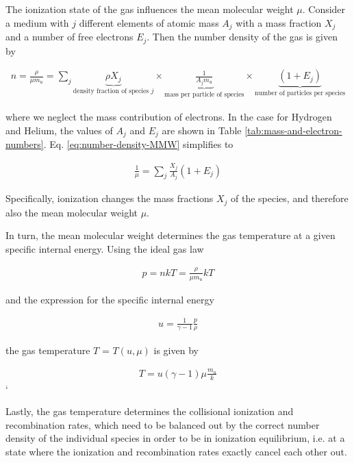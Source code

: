 The ionization state of the gas influences the mean molecular weight $\mu$. Consider a medium with 
$j$ different elements of atomic mass $A_j$ with a mass fraction $X_j$ and a number of free 
electrons $E_j$. Then the number density of the gas is given by

\begin{align}
    n = \frac{\rho}{\mu m_u} = 
        \sum_j \underbrace{\rho X_j}_{\text{density fraction of species } j} \times
        \underbrace{\frac{1}{A_j m_u}}_{\text{mass per particle of species}} \times
        \underbrace{(1 + E_j)}_{\text{number of particles per species}} 
\label{eq:number-density-MMW}
\end{align}


where we neglect the mass contribution of electrons. In the case for Hydrogen and Helium, the 
values 
of $A_j$ and $E_j$ are shown in Table \ref{tab:mass-and-electron-numbers}. Eq. 
\ref{eq:number-density-MMW} simplifies to

\begin{align}
    \frac{1}{\mu} = \sum_j \frac{X_j}{A_j} (1 + E_j)
\end{align}

Specifically, ionization changes the mass fractions $X_j$ of the species, and therefore also the 
mean molecular weight $\mu$.

In turn, the mean molecular weight determines the gas temperature at a given specific internal 
energy. Using the ideal gas law

\begin{align}
    p = n k T = \frac{\rho}{\mu m_u} k T
\end{align}

and the expression for the specific internal energy

\begin{align}
    u = \frac{1}{\gamma - 1} \frac{p}{\rho}
\end{align}

the gas temperature $T$ = $T(u, \mu)$ is given by

\begin{align}
    T = u (\gamma - 1) \mu \frac{m_u}{k}
\end{align}`

Lastly, the gas temperature determines the collisional ionization and recombination rates, which 
need to be balanced out by the correct number density of the individual species in order to be in 
ionization equilibrium, i.e. at a state where the ionization and recombination rates exactly cancel 
each other out.

